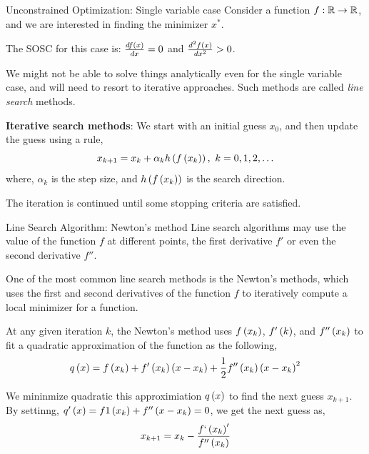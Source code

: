 \documentclass[aspectratio=169]{beamer}
\def\mb{\ensuremath\mathbb}
\def\lp{\ensuremath\left(}
\def\rp{\ensuremath\right)}
\def\R{\ensuremath\mb{R}}
\newcommand{\ct}[1]{\lp #1\rp}
\begin{document}
\begin{frame}{Unconstrained Optimization: Single variable case}
  Consider a function $f: \R \to \R$, and we are interested in finding the minimizer $x^*$.
  \vspace{0.25cm}

  The SOSC for this case is: $\frac{df\ct{x}}{dx} = 0$ and $\frac{d^2f\ct{x}}{dx^2} > 0$.
  \vspace{0.25cm}

  We might not be able to solve things analytically even for the single variable case, and will need to resort to iterative approaches. Such methods are called \textit{line search} methods.
  \vspace{0.25cm}

  \textbf{Iterative search methods}: We start with an initial guess $x_0$, and then update the guess using a rule,
  \[ x_{k+1} = x_k + \alpha_k h\ct{f\ct{x_k}}, \,\, k = 0, 1, 2, \ldots \]
  where, $\alpha_k$ is the step size, and $h\ct{f\ct{x_k}}$ is the search direction.
  \vspace{0.25cm}

  The iteration is continued until some stopping criteria are satisfied.
\end{frame}


\begin{frame}{Line Search Algorithm: Newton's method}
  Line search algorithms may use the value of the function $f$ at different points, the first derivative $f'$ or even the second derivative $f''$.
  \vspace{0.25cm}

  One of the most common line search methods is the Newton's methods, which uses the first and second derivatives of the function $f$ to iteratively compute a local minimizer for a function.

  At any given iteration $k$, the Newton's method uses $f\ct{x_k}$, $f'\ct{k}$, and $f''\ct{x_k}$ to fit a quadratic approximation of the function as the following,
  \[ q\ct{x} = f\ct{x_k} + f'\ct{x_k}\ct{x - x_k} + \frac{1}{2}f''\ct{x_k}\ct{x - x_k}^2 \]

  We  mininmize quadratic this approximiation $q\ct{x}$ to find the next guess $x_{k+1}$. By settinng, $q'\ct{x} = f1\ct{x_k} + f''\ct{x - x_k} = 0$, we get the next guess as,
  \[ x_{k+1} = x_k - \frac{f`\ct{x_k}'}{f''\ct{x_k}} \] 

\end{frame}
\end{document}
